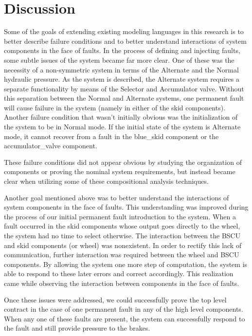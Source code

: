 \section{Discussion}
Some of the goals of extending existing modeling languages in this research is to better describe failure conditions and to better understand interactions of system components in the face of faults. In the process of defining and injecting faults, some subtle issues of the system became far more clear. One of these was the necessity of a non-symmetric system in terms of the Alternate and the Normal hydraulic pressure. As the system is described, the Alternate system requires a separate functionality by means of the Selector and Accumulator valve. Without this separation between the Normal and Alternate systems, one permanent fault will cause failure in the system (namely in either of the skid components). Another failure condition that wasn't initially obvious was the initialization of the system to be in Normal mode. If the initial state of the system is Alternate mode, it cannot recover from a fault in the blue\_skid component or the accumulator\_valve component. 

These failure conditions did not appear obvious by studying the organization of components or proving the nominal system requirements, but instead became clear when utilizing some of these compositional analysis techniques. 

Another goal mentioned above was to better understand the interactions of system components in the face of faults. This understanding was improved during the process of our initial permanent fault introduction to the system. When a fault occurred in the skid components whose output goes directly to the wheel, the system had no time to select otherwise. The interaction between the BSCU and skid components (or wheel) was nonexistent. In order to rectify this lack of communication, further interaction was required between the wheel and BSCU components. By allowing the system one more step of computation, the system is able to respond to these later errors and correct accordingly. This realization came while observing the interaction between components in the face of faults.

Once these issues were addressed, we could successfully prove the top level contract in the case of one permanent fault in any of the high level components. When any one of these faults are present, the system can successfully respond to the fault and still provide pressure to the brakes. 




